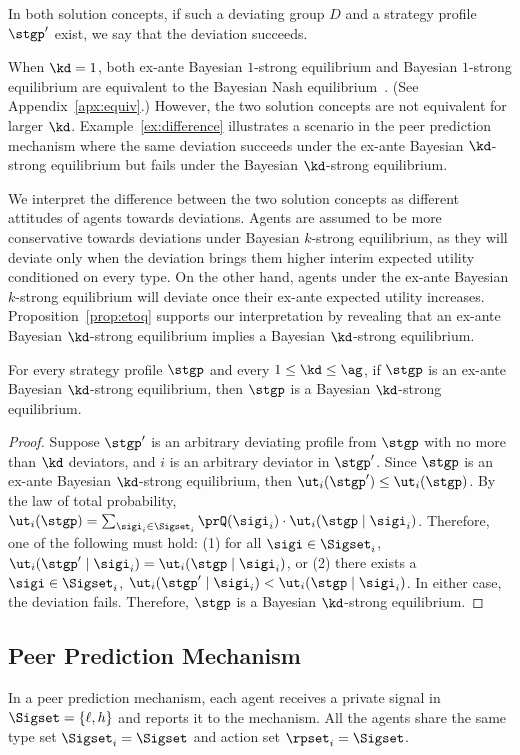 In both solution concepts, if such a deviating group $D$ and a strategy profile $\stgp'$ exist, we say that the deviation succeeds.

When $\kd = 1$, both ex-ante Bayesian $1$-strong equilibrium and Bayesian $1$-strong equilibrium are equivalent to the Bayesian Nash equilibrium~\citep{Harsanyi67}. (See Appendix~\ref{apx:equiv}.) However, the two solution concepts are not equivalent for larger $\kd$. Example~\ref{ex:difference} illustrates a scenario in the peer prediction mechanism where the same deviation succeeds under the ex-ante Bayesian $\kd$-strong equilibrium but fails under the Bayesian $\kd$-strong equilibrium. 

We interpret the difference between the two solution concepts as different attitudes of agents towards deviations. Agents are assumed to be more conservative towards deviations under Bayesian $k$-strong equilibrium, as they will deviate only when the deviation brings them higher interim expected utility conditioned on every type. On the other hand, agents under the ex-ante Bayesian $k$-strong equilibrium will deviate once their ex-ante expected utility increases.  Proposition~\ref{prop:etoq} supports our interpretation by revealing that an ex-ante Bayesian $\kd$-strong equilibrium implies a Bayesian $\kd$-strong equilibrium. 

\begin{prop}
\label{prop:etoq}
    For every strategy profile $\stgp$ and every $1\le \kd \le \ag$, if $\stgp$ is an ex-ante Bayesian $\kd$-strong equilibrium, then $\stgp$ is a Bayesian $\kd$-strong equilibrium. 
\end{prop}
\begin{proof}
    Suppose $\stgp'$ is an arbitrary deviating profile from $\stgp$ with no more than $\kd$ deviators, and $i$ is an arbitrary deviator in $\stgp'$. 
    Since $\stgp$ is an ex-ante Bayesian $\kd$-strong equilibrium, then $\ut_i (\stgp') \le \ut_i (\stgp) $. By the law of total probability,  
    $\ut_i(\stgp) = \sum_{\sigi_i \in \Sigset_i} \prQ(\sigi_i)\cdot \ut_i(\stgp \mid \sigi_i)$. 
    Therefore, one of the following must hold: (1) for all $\sigi\in \Sigset_i$, $\ut_i (\stgp' \mid \sigi_i) = \ut_i (\stgp \mid \sigi_i)$, or (2) there exists a $\sigi\in\Sigset_i$, $\ut_i (\stgp' \mid \sigi_i) < \ut_i (\stgp \mid \sigi_i)$. In either case, the deviation fails. Therefore, $\stgp$ is a Bayesian $\kd$-strong equilibrium. 
\end{proof}

\subsection{Peer Prediction Mechanism}
In a peer prediction mechanism, each agent receives a private signal in $\Sigset = \{\ell, h\}$ and reports it to the mechanism. All the agents share the same type set $\Sigset_i = \Sigset$ and action set $\rpset_i = \Sigset$. 

